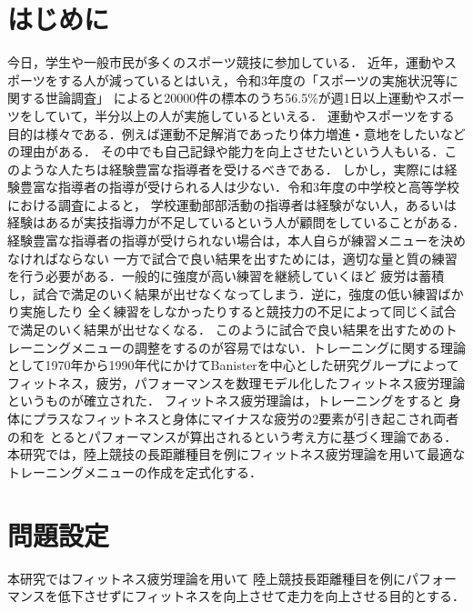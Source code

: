 \documentclass[12pt,fleqn]{jreport}
\begin{document}
\newpage
{}   %
\setlength{\baselineskip}{20pt}   %
\tableofcontents   %
\newpage
\listoffigures   %
\listoftables   %
\clearpage   %
\newpage
\chapter{はじめに}
\large
今日，学生や一般市民が多くのスポーツ競技に参加している．
近年，運動やスポーツをする人が減っているとはいえ，令和3年度の「スポーツの実施状況等に関する世論調査」
によると20000件の標本のうち56.5\%が週1日以上運動やスポーツをしていて，半分以上の人が実施しているといえる\cite{sports1}．
運動やスポーツをする目的は様々である．例えば運動不足解消であったり体力増進・意地をしたいなどの理由がある．
その中でも自己記録や能力を向上させたいという人もいる．このような人たちは経験豊富な指導者を受けるべきである．
しかし，実際には経験豊富な指導者の指導が受けられる人は少ない．令和3年度の中学校と高等学校における調査によると，
学校運動部部活動の指導者は経験がない人，あるいは経験はあるが実技指導力が不足しているという人が顧問をしていることがある\cite{sports2}．
経験豊富な指導者の指導が受けられない場合は，本人自らが練習メニューを決めなければならない
一方で試合で良い結果を出すためには，適切な量と質の練習を行う必要がある．一般的に強度が高い練習を継続していくほど
疲労は蓄積し，試合で満足のいく結果が出せなくなってしまう．逆に，強度の低い練習ばかり実施したり
全く練習をしなかったりすると競技力の不足によって同じく試合で満足のいく結果が出せなくなる．
このように試合で良い結果を出すためのトレーニングメニューの調整をするのが容易ではない．トレーニングに関する理論として1970年から1990年代にかけてBanisterを中心とした研究グループによって
フィットネス，疲労，パフォーマンスを数理モデル化したフィットネス疲労理論というものが確立された\cite{bani}．
フィットネス疲労理論は，トレーニングをすると
身体にプラスなフィットネスと身体にマイナスな疲労の2要素が引き起こされ両者の和を
とるとパフォーマンスが算出されるという考え方に基づく理論である．
本研究では，陸上競技の長距離種目を例にフィットネス疲労理論を用いて最適なトレーニングメニューの作成を定式化する．
\newpage
\chapter{問題設定}
本研究ではフィットネス疲労理論\cite{bani}を用いて
陸上競技長距離種目を例にパフォーマンスを低下させずにフィットネスを向上させて走力を向上させる目的とする．
\vspace{1cm}
\end{document}

